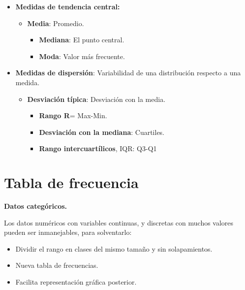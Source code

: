 \documentclass[12pt]{report} %
\begin{document}
\begin{itemize}

\item
  \textbf{Medidas de tendencia central:}

  \begin{itemize}
  
  \item
    \textbf{Media}: Promedio.

    \begin{itemize}
    
    \item
      \textbf{Mediana}: El punto central.
    \item
      \textbf{Moda}: Valor más frecuente.
    \end{itemize}
  \end{itemize}
\item
  \textbf{Medidas de dispersión}: Variabilidad de una distribución
  respecto a una medida.

  \begin{itemize}
  
  \item
    \textbf{Desviación típica}: Desviación con la media.

    \begin{itemize}
    
    \item
      \textbf{Rango R}= Max-Min.
    \item
      \textbf{Desviación con la mediana}: Cuartiles.
    \item
      \textbf{Rango intercuartílicos}, IQR: Q3-Q1
    \end{itemize}
  \end{itemize}
\end{itemize}

\section{Tabla de frecuencia}

\textbf{Datos categóricos.}

Los datos numéricos con variables continuas, y discretas con muchos
valores pueden ser inmanejables, para solventarlo:

\begin{itemize}

\item
  Dividir el rango en clases del mismo tamaño y sin solapamientos.
\item
  Nueva tabla de frecuencias.
\item
  Facilita representación gráfica posterior.
\end{itemize}
\end{document}
